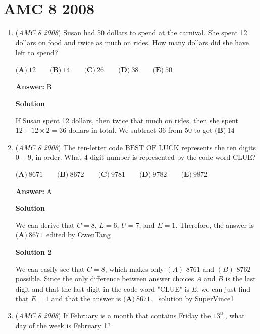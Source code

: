 \section{AMC 8 2008}
        \begin{enumerate}
        	\item (\textit{AMC 8 2008}) Susan had 50 dollars to spend at the carnival. She spent 12 dollars on food and twice as much on rides. How many dollars did she have left to spend?


 $\textbf{(A)}\ 12 \qquad \textbf{(B)}\ 14 \qquad \textbf{(C)}\ 26 \qquad \textbf{(D)}\ 38 \qquad \textbf{(E)}\ 50$

 \textbf{Answer: }B



\textbf{Solution}

If Susan spent 12 dollars, then twice that much on rides, then she spent $12+12 \times 2=36$ dollars in total. We subtract $36$ from $50$ to get $\boxed{\textbf{(B)}\ 14}$



	\item (\textit{AMC 8 2008}) The ten-letter code $\text{BEST OF LUCK}$ represents the ten digits $0-9$, in order. What 4-digit number is represented by the code word $\text{CLUE}$?


 $\textbf{(A)}\ 8671 \qquad \textbf{(B)}\ 8672 \qquad \textbf{(C)}\ 9781 \qquad \textbf{(D)}\ 9782 \qquad \textbf{(E)}\ 9872$

 \textbf{Answer: }A



\textbf{Solution}

We can derive that $C=8$, $L=6$, $U=7$, and $E=1$. Therefore, the answer is $\boxed{\textbf{(A)}\ 8671}$~edited by OwenTang

 



\textbf{Solution 2}

We can easily see that $C=8$, which makes only $(A)$ $8761$ and $(B)$ $8762$ possible. Since the only difference between answer choices $A$ and $B$ is the last digit and that the last digit in the code word "CLUE" is $E$, we can just find that $E=1$ and that the answer is $\boxed{\textbf{(A)}\ 8671}$. ~solution by SuperVince1

 


	\item (\textit{AMC 8 2008}) If February is a month that contains Friday the $13^{\text{th}}$, what day of the week is February 1?



\end{enumerate}

